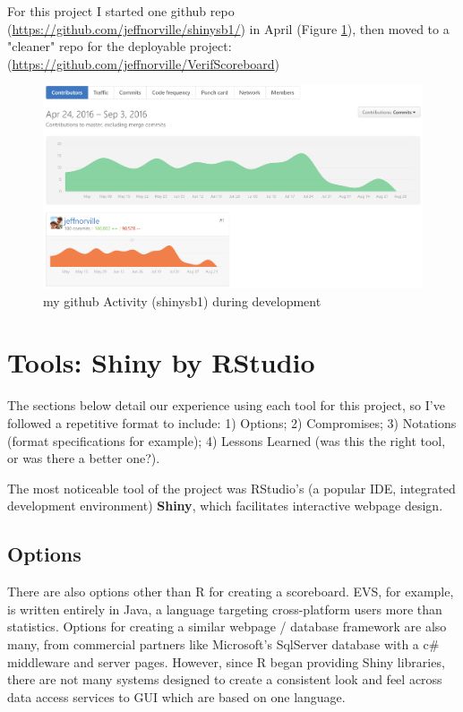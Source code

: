 \documentclass[logos,parttoc,morelanguage=french,morelanguage=german]{orsay-memoire}
\begin{document}
For this project I started one github repo (\href{https://github.com/jeffnorville/shinysb1/}{https://github.com/jeffnorville/shinysb1/}) in April (Figure \ref{fig:githubactivity}), then moved to a "cleaner" repo for the deployable project: (\href{https://github.com/jeffnorville/VerifScoreboard}{https://github.com/jeffnorville/VerifScoreboard})

\begin{figure}[H]
\centering
\includegraphics[width=0.8\linewidth]{images/githPlotCommitActivity.png}
  \caption{my github Activity (shinysb1) during development}
  \label{fig:githubactivity}
\end{figure}

\section{Tools: Shiny by RStudio}

The sections below detail our experience using each tool for this project, so I've followed a repetitive format to include: 1) Options; 2) Compromises; 3) Notations (format specifications for example); 4) Lessons Learned (was this the right tool, or was there a better one?).

The most noticeable tool of the project was RStudio's (a popular IDE, integrated development environment) \textbf{Shiny}, which facilitates interactive webpage design.

\subsection{Options}

There are also options other than R for creating a scoreboard. EVS, for example, is written entirely in Java, a language targeting cross-platform users more than statistics. Options for creating a similar webpage / database framework are also many, from commercial partners like Microsoft's SqlServer database with a c\# middleware and server pages. However, since R began providing Shiny libraries, there are not many systems designed to create a consistent look and feel across data access services to GUI which are based on one language.
\end{document}
